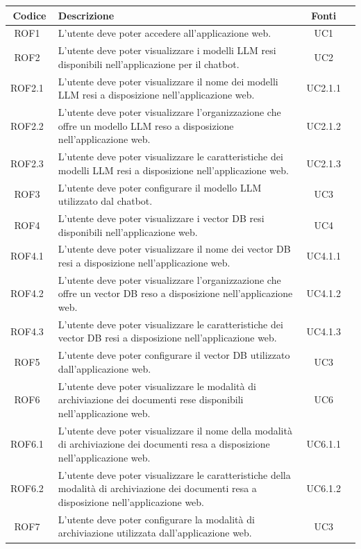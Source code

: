 \documentclass[10pt, a4paper]{article}
\begin{document}
\renewcommand{\arraystretch}{1.5}
\begin{xltabular}{\textwidth}{|c|X|c|c}\hline
\textbf{Codice} & \textbf{Descrizione}  & \textbf{Fonti} \\
\hline ROF1\ & L'utente deve poter accedere all'applicazione web. &  UC1 \\
\hline ROF2\ & L'utente deve poter visualizzare i modelli LLM resi disponibili nell'applicazione per il chatbot. & UC2 \\
\hline ROF2.1\ & L'utente deve poter visualizzare il nome dei modelli LLM resi a disposizione nell'applicazione web. & UC2.1.1 \\
\hline ROF2.2\ & L'utente deve poter visualizzare l'organizzazione che offre un modello LLM reso a disposizione nell'applicazione web. & UC2.1.2 \\
\hline ROF2.3\ & L'utente deve poter visualizzare le caratteristiche dei modelli LLM resi a disposizione nell'applicazione web. & UC2.1.3 \\
\hline ROF3\ & L'utente deve poter configurare il modello LLM utilizzato dal chatbot. & UC3 \\
\hline ROF4\ & L'utente deve poter visualizzare i vector DB resi disponibili nell'applicazione web. & UC4 \\
\hline ROF4.1\ & L'utente deve poter visualizzare il nome dei vector DB resi a disposizione nell'applicazione web. & UC4.1.1 \\
\hline ROF4.2\ & L'utente deve poter visualizzare l'organizzazione che offre un vector DB reso a disposizione nell'applicazione web. & UC4.1.2 \\
\hline ROF4.3\ & L'utente deve poter visualizzare le caratteristiche dei vector DB resi a disposizione nell'applicazione web. & UC4.1.3 \\
\hline ROF5\ & L'utente deve poter configurare il vector DB utilizzato dall'applicazione web. & UC3 \\
\hline ROF6\ & L'utente deve poter visualizzare le modalità di archiviazione dei documenti rese disponibili nell'applicazione web. & UC6 \\
\hline ROF6.1\ & L'utente deve poter visualizzare il nome della modalità di archiviazione dei documenti resa a disposizione nell'applicazione web. & UC6.1.1 \\
\hline ROF6.2\ & L'utente deve poter visualizzare le caratteristiche della modalità di archiviazione dei documenti resa a disposizione nell'applicazione web. & UC6.1.2 \\
\hline ROF7\ & L'utente deve poter configurare la modalità di archiviazione utilizzata dall'applicazione web. & UC3 \\

\end{xltabular}
\end{document}
